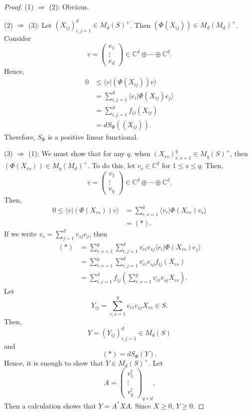 \documentclass[12pt]{article}
\theoremstyle{definition}
\newcommand{\C}{\mathbb{C}}
\begin{document}
\begin{proof}
(1) $\Rightarrow$ (2): Obvious.

(2) $\Rightarrow$ (3): Let $(X_{ij})_{i,j=1}^d \in M_d(S)^+$. Then $(\Phi(X_{ij})) \in M_d(M_d)^+$. Consider
\[
v=\begin{pmatrix}e_1\\ \vdots \\ e_d\end{pmatrix} \in \C^d \oplus \cdots \oplus \C^d.
\]
Hence,
\begin{align*}
0 &\leq \langle v|(\Phi(X_{ij}))v\rangle \\
&= \sum_{i,j=1}^d \langle e_i|\Phi(X_{ij})e_j\rangle \\
&= \sum_{i,j=1}^d f_{ij}(X_{ij}) \\
&= dS_\Phi((X_{ij})).
\end{align*}
Therefore, $S_\Phi$ is a positive linear functional.

(3) $\Rightarrow$ (1): We must show that for any $q$, when $(X_{rs})_{r,s=1}^q \in M_q(S)^+$, then $(\Phi(X_{rs})) \in M_q(M_d)^+$. To do this, let $v_s \in \C^d$ for $1 \leq s \leq q$. Then,
\[
v=\begin{pmatrix}v_1\\ \vdots \\ v_q\end{pmatrix} \in \C^d \oplus \cdots \oplus \C^d.
\]
Then,
\begin{align*}
0 \leq \langle v|(\Phi(X_{rs}))v\rangle &= \sum_{r,s=1}^q \langle v_r|\Phi(X_{rs})v_s\rangle \\
&= (*).
\end{align*}
If we write $v_s=\sum_{j=1}^d v_{sj}e_j$, then
\begin{align*}
(*) &= \sum_{r,s=1}^q \sum_{i,j=1}^d \overline{v_{ri}}v_{sj}\langle e_i|\Phi(X_{rs})e_j\rangle \\
&= \sum_{r,s=1}^q \sum_{i,j=1}^d \overline{v_{ri}}v_{sj}f_{ij}(X_{rs}) \\
&= \sum_{i,j=1}^d f_{ij}\left(\sum_{r,s=1}^q \overline{v_{ri}}v_{sj}X_{rs}\right).
\end{align*}
Let
\[
Y_{ij}=\sum_{r,s=1}^q \overline{v_{ri}}v_{sj}X_{rs} \in S.
\]
Then,
\[
Y=(Y_{ij})_{i,j=1}^d \in M_d(S)
\]
and
\[
(*)=dS_\Phi(Y).
\]
Hence, it is enough to show that $Y \in M_d(S)^+$. Let
\[
A=\begin{pmatrix}v_1^t\\ \vdots \\ v_q^t\end{pmatrix}_{q \times d}.
\]
Then a calculation shows that $Y=A^*XA$. Since $X \geq 0$, $Y \geq 0$.
\end{proof}
\end{document}
